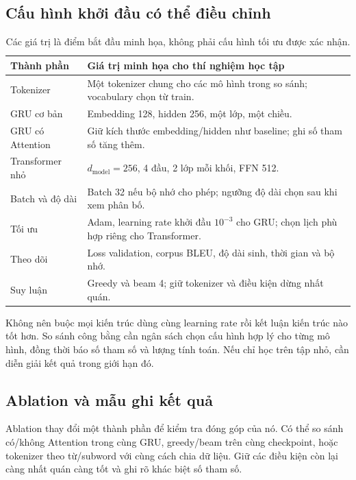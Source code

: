 \documentclass[11pt,a4paper]{article}
\numberwithin{equation}{section}
\begin{document}
\subsection{Cấu hình khởi đầu có thể điều chỉnh}
\begin{table}[H]
\centering\small
\begin{tabularx}{\linewidth}{@{}p{4cm}Y@{}}
\toprule{}Thành phần & Giá trị minh họa cho thí nghiệm học tập\\\midrule
Tokenizer & Một tokenizer chung cho các mô hình trong so sánh; vocabulary chọn từ train.\\
GRU cơ bản & Embedding 128, hidden 256, một lớp, một chiều.\\
GRU có Attention & Giữ kích thước embedding/hidden như baseline; ghi số tham số tăng thêm.\\
Transformer nhỏ & $d_{\mathrm{model}}=256$, 4 đầu, 2 lớp mỗi khối, FFN 512.\\
Batch và độ dài & Batch 32 nếu bộ nhớ cho phép; ngưỡng độ dài chọn sau khi xem phân bố.\\
Tối ưu & Adam, learning rate khởi đầu $10^{-3}$ cho GRU; chọn lịch phù hợp riêng cho Transformer.\\
Theo dõi & Loss validation, corpus BLEU, độ dài sinh, thời gian và bộ nhớ.\\
Suy luận & Greedy và beam 4; giữ tokenizer và điều kiện dừng nhất quán.\\
\bottomrule
\end{tabularx}
\caption{Các giá trị là điểm bắt đầu minh họa, không phải cấu hình tối ưu được xác nhận.}
\end{table}
Không nên buộc mọi kiến trúc dùng cùng learning rate rồi kết luận kiến trúc nào tốt hơn. So sánh công bằng cần ngân sách chọn cấu hình hợp lý cho từng mô hình, đồng thời báo số tham số và lượng tính toán. Nếu chỉ học trên tập nhỏ, cần diễn giải kết quả trong giới hạn đó.

\subsection{Ablation và mẫu ghi kết quả}
Ablation thay đổi một thành phần để kiểm tra đóng góp của nó. Có thể so sánh có/không Attention trong cùng GRU, greedy/beam trên cùng checkpoint, hoặc tokenizer theo từ/subword với cùng cách chia dữ liệu. Giữ các điều kiện còn lại càng nhất quán càng tốt và ghi rõ khác biệt số tham số.
\end{document}
